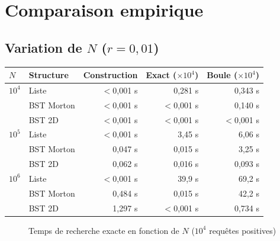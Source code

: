 \section{Comparaison empirique}

\subsection*{Variation de $N$ ($r = 0{,}01$)}

\begin{center}
\begin{tabular}{llrrr}
\toprule
$N$ & Structure & Construction & Exact ($\times 10^4$) & Boule ($\times 10^4$) \\
\midrule
$10^4$ & Liste      & $<$0{,}001 s & 0{,}281 s          & 0{,}343 s           \\
       & BST Morton & $<$0{,}001 s & $<$0{,}001 s       & 0{,}140 s           \\
       & BST 2D     & $<$0{,}001 s & $<$0{,}001 s       & $<$0{,}001 s        \\
\midrule
$10^5$ & Liste      & $<$0{,}001 s & 3{,}45 s           & 6{,}06 s            \\
       & BST Morton & 0{,}047 s    & 0{,}015 s          & 3{,}25 s            \\
       & BST 2D     & 0{,}062 s    & 0{,}016 s          & 0{,}093 s  \\
\midrule
$10^6$ & Liste      & $<$0{,}001 s & 39{,}9 s           & 69{,}2 s            \\
       & BST Morton & 0{,}484 s    & 0{,}015 s          & 42{,}2 s            \\
       & BST 2D     & 1{,}297 s    & $<$0{,}001 s       & 0{,}734 s  \\
\bottomrule
\end{tabular}
\end{center}

\begin{figure}[H]
\centering
{}
\caption{Temps de recherche exacte en fonction de $N$ ($10^4$ requêtes positives)}
\end{figure}


